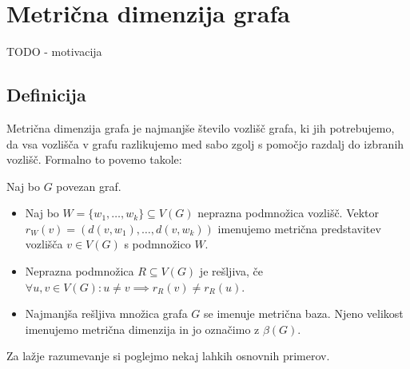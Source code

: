 \documentclass[mat1, tisk]{fmfdelo}
\newcommand{\1}{(1, 1, \ldots, 1)}
\newcommand{\2}{(2, 2, \ldots, 2)}
\begin{document}


\section{Metrična dimenzija grafa} \label{s:mdim}

TODO - motivacija



\subsection{Definicija} \label{ss:def_mdim}

Metrična dimenzija grafa je najmanjše število vozlišč grafa, ki jih potrebujemo, da
vsa vozlišča v grafu razlikujemo med sabo zgolj s pomočjo razdalj do izbranih vozlišč.
Formalno to povemo takole:

\begin{definicija} \label{def:mdim}
    Naj bo $G$ povezan graf. 
    \begin{itemize}
        \item Naj bo $W = \{ w_1, \ldots , w_k  \} \subseteq V(G)$ neprazna podmnožica vozlišč. 
        Vektor $r_W(v) = (d(v, w_1), \ldots, d(v, w_k))$ imenujemo metrična 
        predstavitev vozlišča $v \in V(G)$ s podmnožico $W$.
        \item Neprazna podmnožica $R \subseteq V(G)$ je rešljiva,
        če $\forall u, v \in V(G): u \neq v \implies r_R(v) \neq r_R(u)$.
        \item Najmanjša rešljiva množica grafa $G$ se imenuje metrična baza. Njeno velikost imenujemo 
        metrična dimenzija in jo označimo z $\beta(G).$
    \end{itemize}
\end{definicija}

Za lažje razumevanje si poglejmo nekaj lahkih osnovnih primerov.
\end{document}
